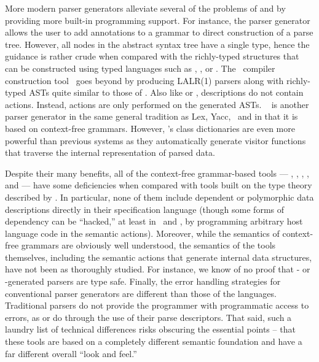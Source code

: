 More modern parser generators alleviate several of the
problems of \lex{} and \yacc{} by providing more built-in programming
support.  For instance, the \antlr{} parser generator~\cite{antlr} allows
the user to add annotations to a grammar to direct construction of a
parse tree. However, all nodes in the abstract syntax tree have a 
single type, hence the guidance is rather crude when compared with
the richly-typed structures that can be constructed using
typed languages such as \padsc{}, \padsml{}, \datascript{} or \ddc. 
The \sablecc\ compiler construction
tool~\cite{sablecc} goes beyond
\antlr{} by producing LALR(1) parsers along with richly-typed ASTs
quite similar to those of \padsc{}. Also like \padsc{} or \padsml{}, 
descriptions
do not contain actions. Instead, actions are only performed on the
generated ASTs. \demeter{}~\cite{lieberherr+:class-dictionaries} is another parser
generator in the same general tradition as Lex, Yacc, \antlr\ and
\sablecc{} in that it is based on context-free grammars.  However,
\demeter{}'s class dictionaries are even more powerful than
previous systems as they
automatically generate visitor functions that traverse the internal
representation of parsed data.

Despite their many benefits, 
all of the context-free grammar-based tools --- \lex{}, \yacc, 
\antlr, \sablecc, and \demeter{} --- have some deficiencies when compared with
tools built on the type theory described by \ddc. 
In particular, none of them include dependent or 
polymorphic data descriptions directly in their specification language
(though some forms of dependency can be ``hacked,'' at least in
\lex\ and \yacc, by programming arbitrary host language 
code in the semantic actions).  Moreover, while the semantics of
context-free grammars are obviously well understood, the semantics of the
tools themselves, including the semantic actions that generate 
internal data structures, have not been as thoroughly studied.
For instance, we know of no proof that \antlr{}- or 
\sablecc{}-generated parsers are type safe.
Finally, the error handling strategies for conventional
parser generators are different than
those of the \pads{} languages.  Traditional parsers 
do not provide the programmer with
programmatic access to errors, as \padsml{} or \padsc{} do through the
use of their parse
descriptors.  That said, such a laundry list of technical differences risks
obscuring the essential points -- that these tools are based on a 
completely different semantic foundation and have a far different
overall ``look and feel.'' 


